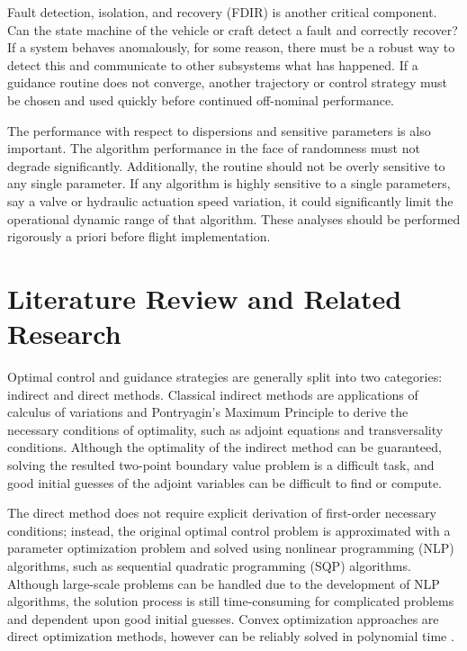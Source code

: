 Fault detection, isolation, and recovery (FDIR) is another critical component. Can the state machine of the vehicle or craft detect a fault and correctly recover? If a system behaves anomalously, for some reason, there must be a robust way to detect this and communicate to other subsystems what has happened. If a guidance routine does not converge, another trajectory or control strategy must be chosen and used quickly before continued off-nominal performance.

The performance with respect to dispersions and sensitive parameters is also important. The algorithm performance in the face of randomness must not degrade significantly. Additionally, the routine should not be overly sensitive to any single parameter. If any algorithm is highly sensitive to a single parameters, say a valve or hydraulic actuation speed variation, it could significantly limit the operational dynamic range of that algorithm. These analyses should be performed rigorously a priori before flight implementation.



\section{Literature Review and Related Research}
Optimal control and guidance strategies are generally split into two categories: indirect and direct methods.
Classical indirect methods are applications of calculus of variations and Pontryagin's Maximum Principle to derive the necessary conditions of optimality, such as adjoint equations and transversality conditions. Although the optimality of the indirect method can be guaranteed, solving the resulted two-point boundary value problem is a difficult task, and good initial guesses of the adjoint variables can be difficult to find or compute.

The direct method does not require explicit derivation of first-order necessary conditions; instead, the original optimal control problem is approximated with a parameter optimization problem and solved using nonlinear programming (NLP) algorithms, such as sequential quadratic programming (SQP) algorithms. Although large-scale problems can be handled due to the development of NLP algorithms, the solution process is still time-consuming for complicated problems and dependent upon good initial guesses. Convex optimization approaches are direct optimization methods, however can be reliably solved in polynomial time \cite{nesterov1994interior}.







